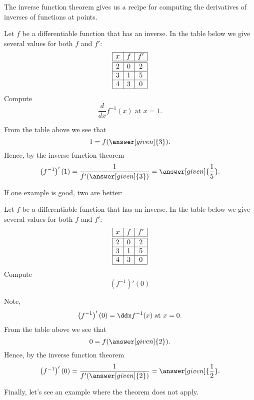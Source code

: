 \documentclass{ximera}
\begin{document}
The inverse function theorem gives us a recipe for computing the
derivatives of inverses of functions at points.

\begin{example}
  Let $f$ be a differentiable function that has an inverse. In the
  table below we give several values for both $f$ and $f'$:
  \[
  \begin{array}{|c|c|c|}\hline
    x & f  & f' \\ \hline \hline
    2 & 0  & 2  \\ \hline
    3 &1  &5 \\ \hline
    4 & 3 & 0  \\ \hline
  \end{array}
  \]
  Compute
  \[
  \frac{d}{dx} f^{-1}(x)\;\text{at $x=1$.}
  \]
  \begin{explanation}
    From the table above we see that
    \[
    1 = f(\answer [given]{3}).
    \]
    Hence, by the inverse function theorem
    \[
    \left(f^{-1}\right)' (1)= \frac{1}{f'(\answer[given]{3})} = \answer[given]{\frac{1}{5}}.
    \]
  \end{explanation}
\end{example}

If one example is good, two are better:

\begin{example}
  Let $f$ be a differentiable function that has an inverse. In the
  table below we give several values for both $f$ and $f'$:
  \[
  \begin{array}{|c|c|c|}\hline
    x & f  & f' \\ \hline \hline
    2 & 0  & 2  \\ \hline
    3 & 1  &5 \\ \hline
    4 & 3 & 0  \\ \hline
  \end{array}
  \]
  Compute
  \[
  \left(f^{-1}\right)'(0)
  \]
  \begin{explanation}
    Note,
    \[
    \left(f^{-1}\right)'(0) = \ddx f^{-1}(x)\;\text{at $x=0$.}
    \]
    From the table above we see that
    \[
    0 = f(\answer[given]{2}).
    \]
    Hence, by the inverse function theorem
    \[
    \left(f^{-1}\right)'(0) = \frac{1}{f'(\answer[given]{2})} = \answer[given]{\frac{1}{2}}.
    \]
  \end{explanation}
\end{example}

Finally, let's see an example where the theorem does not apply.
\end{document}
